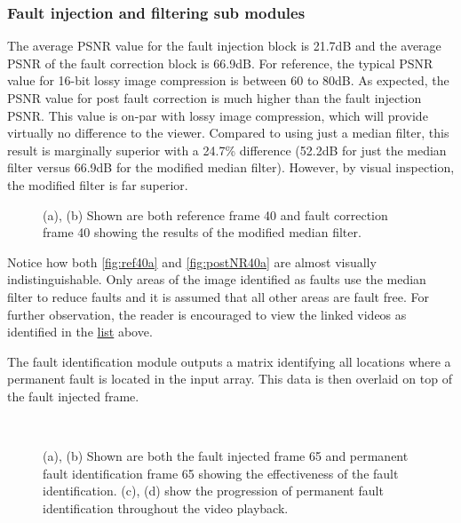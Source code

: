 \subsubsection{Fault injection and filtering sub modules}
\par The average PSNR value for the fault injection block is 21.7dB and the average PSNR of the fault correction block is 66.9dB. For reference, the typical PSNR value for 16-bit lossy image  compression is between 60 to 80dB\cite{welstead_1999}. As expected, the PSNR value for post fault correction is much higher than the fault injection PSNR. This value is on-par with lossy image compression, which will provide virtually no difference to the viewer. Compared to using just a median filter, this result is marginally superior with a 24.7\% difference (52.2dB for just the median filter versus 66.9dB for the modified median filter). However, by visual inspection, the modified filter is far superior.
\begin{figure}[H]
    \hfill
    \caption{(a), (b) Shown are both reference frame 40 and fault correction frame 40 showing the results of the modified median filter.}
    \label{fig:ref-postNR40}
\end{figure}
\par Notice how both \autoref{fig:ref40a} and \autoref{fig:postNR40a} are almost visually indistinguishable. Only areas of the image identified as faults use the median filter to reduce faults and it is assumed that all other areas are fault free. For further observation, the reader is encouraged to view the linked videos as identified in the \hyperref[list:urlList]{list} above.
\par The fault identification module outputs a matrix identifying all locations where a permanent fault is located in the input array. This data is then overlaid on top of the fault injected frame.
\begin{figure}[H]
    \hfill
    \\
    \hfill
    \caption{(a), (b) Shown are both the fault injected frame 65 and permanent fault identification frame 65 showing the effectiveness of the fault identification. (c), (d) show the progression of permanent fault identification throughout the video playback.}
    \label{fig:noisy-ID65}
\end{figure}
